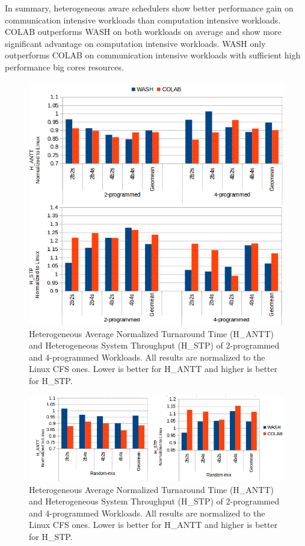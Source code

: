 In summary, heterogeneous aware schedulers show better performance gain on communication intensive workloads than computation intensive workloads. COLAB outperforms WASH on both workloads on average and show more significant advantage on computation intensive workloads. WASH only outperforms COLAB on communication intensive workloads with sufficient high performance big cores resources.



\begin{figure}
\centering
\includegraphics[scale=0.35]{figures/nprog.png}
\caption{Heterogeneous Average Normalized Turnaround Time (H\_ANTT) and Heterogeneous System Throughput (H\_STP) of 2-programmed and 4-programmed Workloads. All results are normalized to the Linux CFS ones. Lower is better for H\_ANTT and higher is better for H\_STP.}
\label{nprog}
\end{figure} 

\begin{figure}
\centering
\includegraphics[scale=0.5]{figures/rand.png}
\caption{Heterogeneous Average Normalized Turnaround Time (H\_ANTT) and Heterogeneous System Throughput (H\_STP) of 2-programmed and 4-programmed Workloads. All results are normalized to the Linux CFS ones. Lower is better for H\_ANTT and higher is better for H\_STP.}
\label{rand}
\end{figure} 

